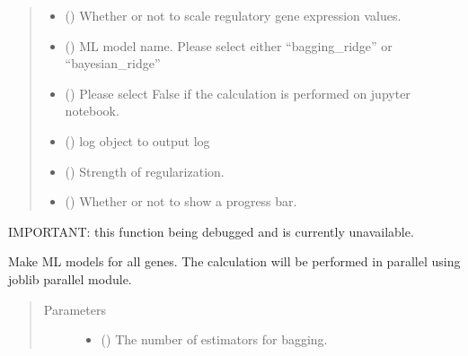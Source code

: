 \documentclass[letterpaper,10pt,english]{sphinxmanual}
\begin{document}
\begin{fulllineitems}
\begin{fulllineitems}
\begin{quote}
\begin{description}
\begin{itemize}
\item {} 
 () \textendash{} Whether or not to scale regulatory gene expression values.

\item {} 
 () \textendash{} ML model name. Please select either “bagging\_ridge” or “bayesian\_ridge”

\item {} 
 () \textendash{} Please select False if the calculation is performed on jupyter notebook.

\item {} 
 () \textendash{} log object to output log

\item {} 
 () \textendash{} Strength of regularization.

\item {} 
 () \textendash{} Whether or not to show a progress bar.

\end{itemize}

\end{description}\end{quote}

\end{fulllineitems}


\begin{fulllineitems}
\label{\detokenize{modules/celloracle:celloracle.Net.fit_All_genes_parallel}}
IMPORTANT: this function being debugged and is currently unavailable.

Make ML models for all genes.
The calculation will be performed in parallel using joblib parallel module.
\begin{quote}\begin{description}
\item[{Parameters}] \leavevmode\begin{itemize}
\item {} 
 () \textendash{} The number of estimators for bagging.


\end{itemize}
\end{description}
\end{quote}
\end{fulllineitems}
\end{fulllineitems}
\end{document}
